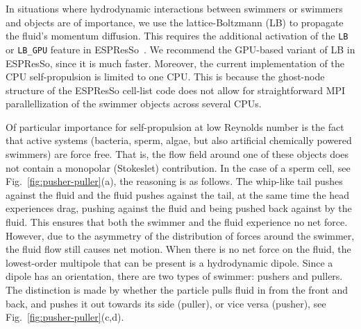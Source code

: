 \documentclass[aip,jcp,reprint,a4paper,onecolumn,amsmath]{revtex4-1}
\newcommand\code{\lstinline}
\newcommand{\es}{\mbox{\textsf{ESPResSo}}\xspace}
\begin{document}
In situations where hydrodynamic interactions between swimmers or swimmers and
objects are of importance, we use the lattice-Boltzmann (LB) to propagate the
fluid's momentum diffusion. This requires the additional activation of the
\code{LB} or \code{LB_GPU} feature in \es{}~\cite{UG,Arnold_13,roehm12}. We
recommend the GPU-based variant of LB in \es{}, since it is much faster.
Moreover, the current implementation of the CPU self-propulsion is limited to
one CPU. This is because the ghost-node structure of the \es{} cell-list code
does not allow for straightforward MPI parallellization of the swimmer objects
across several CPUs.

Of particular importance for self-propulsion at low Reynolds number is the fact
that active systems (bacteria, sperm, algae, but also artificial chemically
powered swimmers) are force free. That is, the flow field around one of these
objects does not contain a monopolar (Stokeslet) contribution. In the case of a
sperm cell, see Fig.~\ref{fig:pusher-puller}(a), the reasoning is as follows.
The whip-like tail pushes against the fluid and the fluid pushes against the
tail, at the same time the head experiences drag, pushing against the fluid and
being pushed back against by the fluid. This ensures that both the swimmer and
the fluid experience no net force. However, due to the asymmetry of the
distribution of forces around the swimmer, the fluid flow still causes net
motion. When there is no net force on the fluid, the lowest-order multipole
that can be present is a hydrodynamic dipole. Since a dipole has an
orientation, there are two types of swimmer: pushers and pullers. The
distinction is made by whether the particle pulls fluid in from the front and
back, and pushes it out towards its side (puller), or vice versa (pusher), see
Fig.~\ref{fig:pusher-puller}(c,d).
\end{document}
